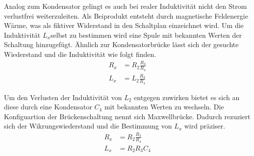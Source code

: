Analog zum Kondensator gelingt es auch bei realer Induktivität nicht den Strom verlustfrei weiterzuleiten.
Als Beiprodukt entsteht durch magnetische Feldenergie Wärme, was als fiktiver Widerstand in den Schaltplan einzeichnet wird.
Um die Induktivität $L_x$selbst zu bestimmen wird eine Spule mit bekannten Werten der Schaltung hinzugefügt. 
Ähnlich zur Kondensatorbrücke lässt sich der gesuchte Wiederstand und die Induktivität wie folgt finden.
\begin{align}
    R_x &= R_2\frac{R_3}{R_4} \\
    L_x &= L_2\frac{R_3}{R_4}
\end{align}

Um den Verlusten der Induktivität von $L_2$ entgegen zuwirken bietet es sich an diese durch eine Kondensator $C_4$ mit bekannten Werten
zu wechseln. Die Konfiguartion der Brückenschaltung nennt sich Maxwellbrücke.
Dadurch rezuziert sich der Wikrungswiederstand und die Bestimmung von $L_x$ wird präziser.
\begin{align}
    R_x &= R_2\frac{R_3}{R_4} \\
    L_x &= R_2R_3C_4
\end{align}
\\
\newline
